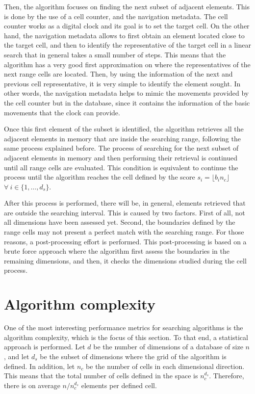 \documentclass[review]{elsarticle}
\begin{document}
Then, the algorithm focuses on finding the next subset of adjacent elements. This is done by the use of a cell counter, and the navigation metadata. The cell counter works as a digital clock and its goal is to set the target cell. On the other hand, the navigation metadata allows to first obtain an element located close to the target cell, and then to identify the representative of the target cell in a linear search that in general takes a small number of steps. This means that the algorithm has a very good first approximation on where the representatives of the next range cells are located. Then, by using the information of the next and previous cell representative, it is very simple to identify the element sought. In other words, the navigation metadata helps to mimic the movements provided by the cell counter but in the database, since it contains the information of the basic movements that the clock can provide.

Once this first element of the subset is identified, the algorithm retrieves all the adjacent elements in memory that are inside the searching range, following the same process explained before. The process of searching for the next subset of adjacent elements in memory and then performing their retrieval is continued until all range cells are evaluated. This condition is equivalent to continue the process until the algorithm reaches the cell defined by the score $s_i = \lfloor b_in_c \rfloor$ $\forall \: i\in\{1,\dots,d_s\}$.

After this process is performed, there will be, in general, elements retrieved that are outside the searching interval. This is caused by two factors. First of all, not all dimensions have been assessed yet. Second, the boundaries defined by the range cells may not present a perfect match with the searching range. For those reasons, a post-processing effort is performed. This post-processing is based on a brute force approach where the algorithm first assess the boundaries in the remaining dimensions, and then, it checks the dimensions studied during the cell process.



\section{Algorithm complexity}
\label{sec:complexity}

One of the most interesting performance metrics for searching algorithms is the algorithm complexity, which is the focus of this section. To that end, a statistical approach is performed. Let $d$ be the number of dimensions of a database of size $n$, and let $d_s$ be the subset of dimensions where the grid of the algorithm is defined. In addition, let $n_c$ be the number of cells in each dimensional direction. This means that the total number of cells defined in the space is $n_c^{d_s}$. Therefore, there is on average $n/n_c^{d_s}$ elements per defined cell.
\end{document}
